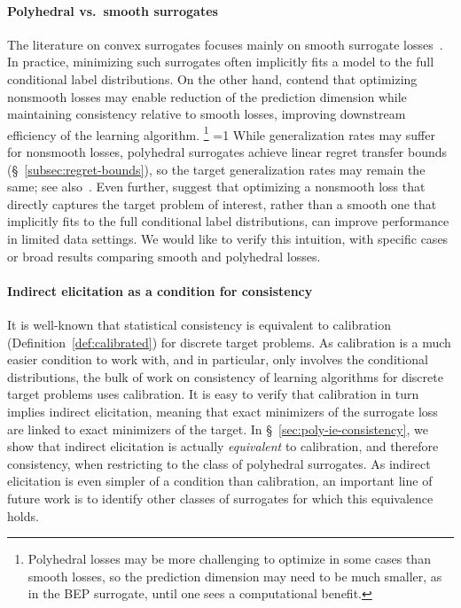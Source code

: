 \documentclass[twoside,11pt]{article}
\newcommand{\Comments}{1}
\newcommand{\CommentsR}{1}
\newcommand{\mynote}[2]{\ifnum\Comments=1\textcolor{#1}{#2}\fi}
\newcommand{\reviewerresponse}[2]{\ifnum\CommentsR=1%
  \todo[linecolor=#1!80!black,backgroundcolor=#1,bordercolor=#1!80!black]{#2}\fi}
\newcommand{\raf}[1]{\mynote{darkgreen}{[RF: #1]}}
\newcommand{\reviewertwo}[1]{\reviewerresponse{blue!20!white}{R2: #1}}
\begin{document}
\paragraph{Polyhedral vs.\ smooth surrogates}
The literature on convex surrogates focuses mainly on smooth surrogate losses~\citep{crammer2001algorithmic,bartlett2006convexity,bartlett2008classification, duchi2018multiclass, williamson2016composite, reid2010composite,menon2019multilabel,zhang2020convex,bao2020calibrated}.
In practice, minimizing such surrogates often implicitly fits a model to the full conditional label distributions.
On the other hand, \citet[Section 1.2]{ramaswamy2018consistent} contend that optimizing nonsmooth losses may enable reduction of the prediction dimension while maintaining consistency relative to smooth losses, improving downstream efficiency of the learning algorithm.%
\footnote{Polyhedral losses may be more challenging to optimize in some cases than smooth losses, so the prediction dimension may need to be much smaller, as in the BEP surrogate, until one sees a computational benefit.}
\reviewertwo{B}
While generalization rates may suffer for nonsmooth losses, polyhedral surrogates achieve linear regret transfer bounds (\S~\ref{subsec:regret-bounds}), so the target generalization rates may remain the same; see also~\citet{frongillo2021surrogate}.
Even further, \citet{lapin2016loss} suggest that optimizing a nonsmooth loss that directly captures the target problem of interest, rather than a smooth one that implicitly fits to the full conditional label distributions, can improve performance in limited data settings.
We would like to verify this intuition, with specific cases or broad results comparing smooth and polyhedral losses.


\paragraph{Indirect elicitation as a condition for consistency}

It is well-known that statistical consistency is equivalent to calibration (Definition~\ref{def:calibrated}) for discrete target problems.
As calibration is a much easier condition to work with, and in particular, only involves the conditional distributions, the bulk of work on consistency of learning algorithms for discrete target problems uses calibration.
It is easy to verify that calibration in turn implies indirect elicitation, meaning that exact minimizers of the surrogate loss are linked to exact minimizers of the target.
In \S~\ref{sec:poly-ie-consistency}, we show that indirect elicitation is actually \emph{equivalent} to calibration, and therefore consistency, when restricting to the class of polyhedral surrogates.
As indirect elicitation is even simpler of a condition than calibration, an important line of future work is to identify other classes of surrogates for which this equivalence holds.
\end{document}
